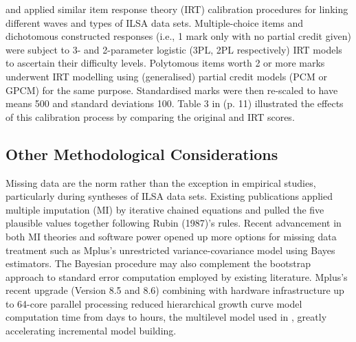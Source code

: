 \documentclass[
    a4paper,            %
    12pt,               %
    stu,                %
    donotrepeattitle,   %
    noextraspace,       %
    floatsintext,       %
    biblatex,           %
    colorlinks=true,        %
    linkcolor=red,          %
    anchorcolor=black,      %
    citecolor=blue,         %
    urlcolor=blue,          %
    bookmarks=true,         %
    bookmarksopen=false,    %
    bookmarksnumbered=true  %
]{apa7}
\begin{document}
\textcite{majoros:2021} and \textcite{strietholt:2016} applied similar item response theory (IRT) calibration procedures for linking different waves and types of ILSA data sets. Multiple-choice items and dichotomous constructed responses (i.e., 1 mark only with no partial credit given) were subject to 3- and 2-parameter logistic (3PL, 2PL respectively) IRT models to ascertain their difficulty levels. Polytomous items worth 2 or more marks underwent IRT modelling using (generalised) partial credit models (PCM or GPCM) for the same purpose. Standardised marks were then re-scaled to have means 500 and standard deviations 100. Table 3 in \textcite{strietholt:2016} (p. 11) illustrated the effects of this calibration process by comparing the original and IRT scores.

\subsection{Other Methodological Considerations}

Missing data are the norm rather than the exception in empirical studies, particularly during syntheses of ILSA data sets. Existing publications applied multiple imputation (MI) by iterative chained equations and pulled the five plausible values together following Rubin (1987)'s rules. Recent advancement in both MI theories and software power opened up more options for missing data treatment such as Mplus's unrestricted variance-covariance model using Bayes estimators. The Bayesian procedure may also complement the bootstrap approach to standard error computation employed by existing literature. Mplus's recent upgrade (Version 8.5 and 8.6) combining with hardware infrastructure up to 64-core parallel processing reduced hierarchical growth curve model computation time from days to hours, the multilevel model used in \textcite{chmielewski:2019}, greatly accelerating incremental model building.

\printbibliography
\end{document}
